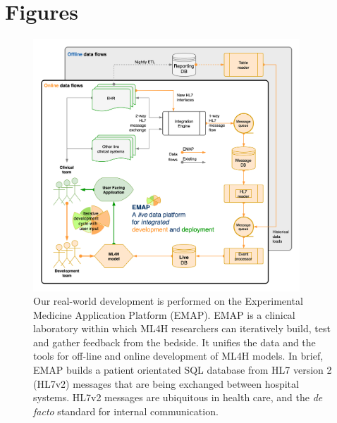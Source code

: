 \documentclass[utf8]{FrontiersinVancouver}
\begin{document}
 




\section*{Figures}


\begin{figure}[h!]
\begin{center}
\includegraphics[width=10cm]{assets/emap.png}%
\end{center}
\caption{ 
Our real-world development is performed on the  Experimental Medicine Application Platform (EMAP). EMAP is a clinical laboratory within which ML4H researchers can iteratively build, test and gather feedback from the bedside. It unifies the data and the tools for off-line and online development of ML4H models. In brief, EMAP builds a patient orientated SQL database from HL7 version 2 (HL7v2) messages that are being exchanged between hospital systems. HL7v2 messages are ubiquitous in health care, and the \textit{de facto} standard for internal communication. }\label{fig:1}
\end{figure}
\end{document}
